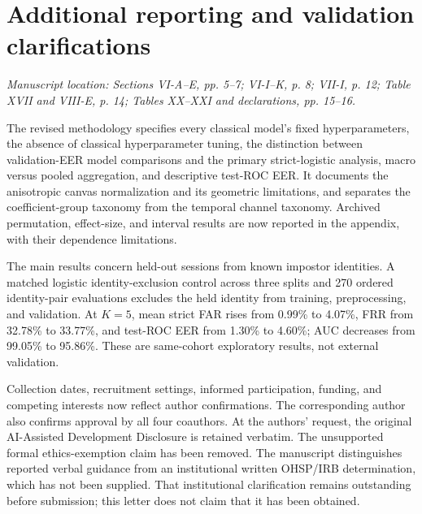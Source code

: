 \documentclass[11pt]{article}
\newcommand{\location}[1]{\par\noindent\textit{Manuscript location: #1.}\par}
\begin{document}
\section*{Additional reporting and validation clarifications}
\location{Sections VI-A--E, pp. 5--7; VI-I--K, p. 8; VII-I, p. 12; Table XVII and VIII-E, p. 14; Tables XX--XXI and declarations, pp. 15--16}
The revised methodology specifies every classical model's fixed
hyperparameters, the absence of classical hyperparameter tuning, the distinction
between validation-EER model comparisons and the primary strict-logistic
analysis, macro versus pooled aggregation, and descriptive test-ROC EER.
It documents the anisotropic canvas normalization and its geometric
limitations, and separates the coefficient-group taxonomy from the temporal
channel taxonomy. Archived permutation, effect-size, and interval results are
now reported in the appendix, with their dependence limitations.

The main results concern held-out sessions from known impostor identities.
A matched logistic identity-exclusion control across three splits and 270
ordered identity-pair evaluations excludes the held identity from training,
preprocessing, and validation. At $K=5$, mean strict FAR rises from 0.99\%
to 4.07\%, FRR from 32.78\% to 33.77\%, and test-ROC EER from 1.30\% to
4.60\%; AUC decreases from 99.05\% to 95.86\%. These are same-cohort
exploratory results, not external validation.

Collection dates, recruitment settings, informed participation, funding, and
competing interests now reflect author confirmations. The corresponding author
also confirms approval by all four coauthors. At the authors' request, the
original AI-Assisted Development Disclosure is retained verbatim. The unsupported formal
ethics-exemption claim has been removed. The manuscript distinguishes reported
verbal guidance from an institutional written OHSP/IRB determination, which
has not been supplied. That institutional clarification remains outstanding
before submission; this letter does not claim that it has been obtained.
\end{document}
